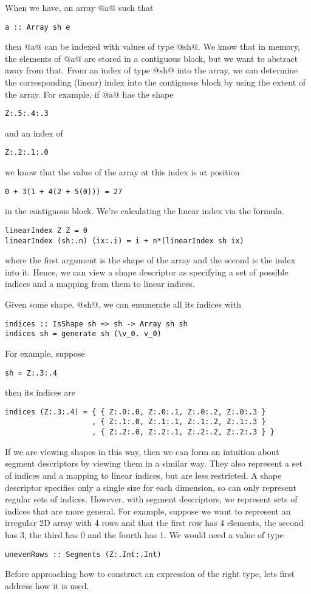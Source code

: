 When we have, an array @a@ such that
%
\begin{lstlisting}
a :: Array sh e
\end{lstlisting}
%
then @a@ can be indexed with values of type @sh@. We know that in memory, the elements of @a@ are stored in a contiguous block, but we want to abstract away from that. From an index of type @sh@ into the array, we can determine the corresponding (linear) index into the contiguous block by using the extent of the array. For example, if @a@ has the shape
%
\begin{lstlisting}
Z:.5:.4:.3
\end{lstlisting}
%
and an index of
%
\begin{lstlisting}
Z:.2:.1:.0
\end{lstlisting}
%
we know that the value of the array at this index is at position
%
\begin{lstlisting}
0 + 3(1 + 4(2 + 5(0))) = 27
\end{lstlisting}
%
in the contiguous block. We're calculating the linear index via the formula.
%
\begin{lstlisting}
linearIndex Z Z = 0
linearIndex (sh:.n) (ix:.i) = i + n*(linearIndex sh ix)
\end{lstlisting}
%
where the first argument is the shape of the array and the second is the index into it. Hence, we can view a shape descriptor as specifying a set of possible indices and a mapping from them to linear indices.

Given some shape, @sh@, we can enumerate all its indices with
%
\begin{lstlisting}
indices :: IsShape sh => sh -> Array sh sh
indices sh = generate sh (\v_0. v_0)
\end{lstlisting}
%
For example, suppose
%
\begin{lstlisting}
sh = Z:.3:.4
\end{lstlisting}
%
then its indices are
%
\begin{lstlisting}
indices (Z:.3:.4) = { { Z:.0:.0, Z:.0:.1, Z:.0:.2, Z:.0:.3 }
                    , { Z:.1:.0, Z:.1:.1, Z:.1:.2, Z:.1:.3 }
                    , { Z:.2:.0, Z:.2:.1, Z:.2:.2, Z:.2:.3 } }
\end{lstlisting}

If we are viewing shapes in this way, then we can form an intuition about segment descriptors by viewing them in a similar way. They also represent a set of indices and a mapping to linear indices, but are less restricted. A shape descriptor specifies only a single size for each dimension, so can only represent regular sets of indices. However, with segment descriptors, we represent sets of indices that are more general. For example, suppose we want to represent an irregular 2D array with 4 rows and that the first row has 4 elements, the second has 3, the third has 0 and the fourth has 1. We would need a value of type
%
\begin{lstlisting}
unevenRows :: Segments (Z:.Int:.Int)
\end{lstlisting}
%
Before approaching how to construct an expression of the right type, lets first address how it is used.

